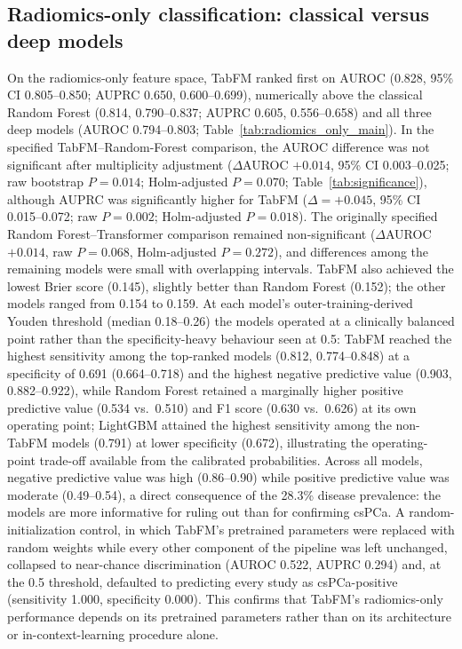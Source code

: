 \documentclass[11pt]{article}
\begin{document}
\subsection{Radiomics-only classification: classical versus deep models}
\label{sec:res-radiomics}

On the radiomics-only feature space, TabFM ranked first on AUROC (0.828, 95\%
CI 0.805--0.850; AUPRC 0.650, 0.600--0.699), numerically above the classical
Random Forest (0.814, 0.790--0.837; AUPRC 0.605, 0.556--0.658) and all three
deep models (AUROC 0.794--0.803; Table~\ref{tab:radiomics_only_main}). In the
specified TabFM--Random-Forest comparison, the AUROC difference was not
significant after multiplicity adjustment ($\Delta$AUROC $+0.014$, 95\% CI
0.003--0.025; raw bootstrap $P=0.014$; Holm-adjusted $P=0.070$;
Table~\ref{tab:significance}), although AUPRC was significantly higher for
TabFM ($\Delta=+0.045$, 95\% CI 0.015--0.072; raw $P=0.002$; Holm-adjusted
$P=0.018$). The originally specified Random Forest--Transformer comparison
remained non-significant ($\Delta$AUROC $+0.014$, raw $P=0.068$, Holm-adjusted
$P=0.272$), and differences among the remaining models were small with
overlapping intervals. TabFM also achieved the lowest Brier score (0.145),
slightly better than Random Forest (0.152); the other models ranged from 0.154
to 0.159. At each model's outer-training-derived Youden threshold (median
0.18--0.26) the models operated at a clinically balanced point rather than the
specificity-heavy behaviour seen at 0.5: TabFM reached the highest sensitivity
among the top-ranked models (0.812, 0.774--0.848) at a specificity of 0.691
(0.664--0.718) and the highest negative predictive value (0.903, 0.882--0.922),
while Random Forest retained a marginally higher positive predictive value
(0.534 vs.\ 0.510) and F1 score (0.630 vs.\ 0.626) at its own operating point;
LightGBM attained the highest sensitivity among the non-TabFM models (0.791) at
lower specificity (0.672), illustrating the operating-point trade-off available
from the calibrated probabilities. Across all models, negative predictive value
was high (0.86--0.90) while positive predictive value was moderate (0.49--0.54),
a direct consequence of the 28.3\% disease prevalence: the models are more
informative for ruling out than for confirming csPCa. A random-initialization
control, in which TabFM's pretrained parameters were replaced with random
weights while every other component of the pipeline was left unchanged,
collapsed to near-chance discrimination (AUROC 0.522, AUPRC 0.294) and, at the
0.5 threshold, defaulted to predicting every study as csPCa-positive
(sensitivity 1.000, specificity 0.000). This confirms
that TabFM's radiomics-only performance depends on its pretrained parameters
rather than on its architecture or in-context-learning procedure alone.
\end{document}
